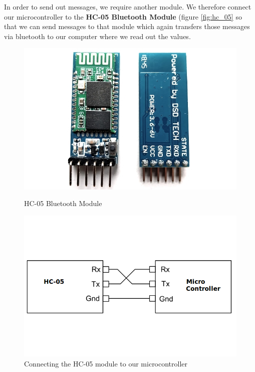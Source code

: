 In order to send out messages, we require another module. We therefore connect our microcontroller to the \textbf{HC-05 Bluetooth Module} (figure \ref{fig:hc_05} so that we can send messages to that module which again transfers those messages via bluetooth to our computer where we read out the values.

\begin{figure}[htb]
    \centering
    \begin{minipage}{.5\textwidth}
          \centering
            \includegraphics[width=.9\linewidth]{figures/software/uart_hc05.jpg}
              \caption{HC-05 Bluetooth Module}
                \label{fig:hc_05}
    \end{minipage}%
    \begin{minipage}{.5\textwidth}
          \centering
            \includegraphics[width=.9\linewidth]{figures/software/uart_plug.png}
              \caption{Connecting the HC-05 module to our microcontroller}
                \label{fig:wire_3}
    \end{minipage}
\end{figure}

